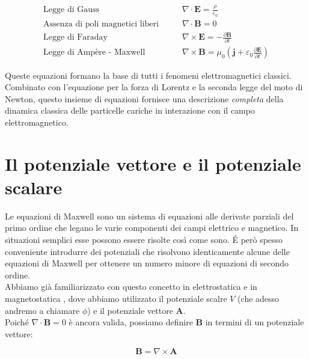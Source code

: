 \begin{tcolorbox}[colback=yellow!10!white, colframe=orange!70!black, boxrule=0.8pt]
\begin{align} \label{eq: Equazioni_di_Maxwell}
\text{Legge di Gauss} & \qquad \nabla \cdot \mathbf{E} = \frac{\rho}{\varepsilon_0} \\
\text{Assenza di poli magnetici liberi} & \qquad \nabla \cdot \mathbf{B} = 0 \\
\text{Legge di Faraday} & \qquad \nabla \times \mathbf{E} = - \frac{\partial \mathbf{B}}{\partial t} \\
\text{Legge di Ampère - Maxwell } & \qquad \nabla \times \mathbf{B} = \mu_0 \left( \mathbf{j} + \varepsilon_0 \frac{\partial \mathbf{E}}{\partial t} \right)
\end{align}
\end{tcolorbox}

\newpage

Queste equazioni formano la base di tutti i fenomeni elettromagnetici classici. \\

Combinato con l'equazione per la forza di Lorentz e la seconda legge del moto di Newton, questo insieme di equazioni fornisce una descrizione \emph{completa} della dinamica classica delle particelle cariche in interazione con il campo elettromagnetico. 

\section{Il potenziale vettore e il potenziale scalare}

Le equazioni di Maxwell sono un sistema di equazioni alle derivate parziali del primo ordine che legano le varie componenti dei campi elettrico e magnetico. 
In situazioni semplici esse possono essere risolte così come sono. \'E però spesso conveniente introdurre dei potenziali che risolvono identicamente alcune delle equazioni di Maxwell per ottenere un numero minore di equazioni di secondo ordine. \\

Abbiamo già familiarizzato con questo concetto in elettrostatica e in magnetostatica , dove abbiamo utilizzato il potenziale scalre $V$ (che adesso andremo a chiamare $\phi$) e il potenziale vettore $\mathbf{A}$. \\
Poiché $\nabla \cdot \mathbf{B} = 0$ è ancora valida, possiamo definire $\mathbf{B}$ in termini di un potenziale vettore:

\begin{tcolorbox}[colback=yellow!10!white, colframe=orange!70!black, boxrule=0.8pt]
\begin{equation}
    \mathbf{B} = \nabla \times \mathbf{A}
\end{equation}
\end{tcolorbox}

